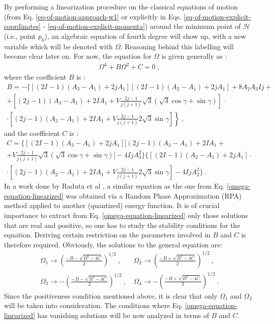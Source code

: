By performing a linearization procedure on the classical equations of motion (from Eq. \ref{eq-of-motion-approach-w1} or explicitly in Eqs. \ref{eq-of-motion-explicit-coordinates} - \ref{eq-of-motion-explicit-momenta}) around the minimum point of $\mathcal{H}$ (i.e., point $p_0$), an algebraic equation of fourth degree will show up, with a new variable which will be denoted with $\Omega$. Reasoning behind this labelling will become clear later on. For now, the equation for $\Omega$ is given generally as \cite{raduta2020towards}:
\begin{align}
    \Omega^4+B\Omega^2+C=0\ ,
    \label{omega-equation-linearized}
\end{align}
where the coefficient $B$ is \cite{raduta2020approach}:
\begin{multline}
    B=-\bigg\{\left[ (2I-1)(A_3-A_1)+2jA_1\right]\left[(2I-1)(A_2-A_1)+2jA_1\right]+8A_2A_3Ij+\\
    +\left[(2j-1)(A_3-A_1)+2IA_1+V\frac{2j-1}{j(j+1)}\sqrt{3}\left(\sqrt{3}\cos\gamma+\sin\gamma\right)\right]\cdot\\
    \left.\cdot\left[(2j-1)(A_2-A_1)+2IA_1+V\frac{2j-1}{j(j+1)}2\sqrt{3}\sin\gamma\right]\right\}\ ,
    \label{omega-B-term}
\end{multline}
and the coefficient $C$ is \cite{raduta2020approach}:
\begin{multline}
    C=\bigg\{\left[(2I-1)(A_3-A_1)+2jA_1\right]\bigg[(2j-1)(A_3-A_1)+2IA_1+\\
    +V\frac{2j-1}{j(j+1)}\sqrt{3}(\sqrt{3}\cos\gamma+\sin\gamma)\bigg]-4IjA_3^2\bigg\}\bigg\{\left[(2I-1)(A_2-A_1)+2jA_1\right]\cdot\\
    \cdot\left[(2j-1)(A_2-A_1)+2IA_1+V\frac{2j-1}{j(j+1)}2\sqrt{3}\sin\gamma\right]-4IjA_2^2\bigg\}\ .
    \label{omega-C-term}
\end{multline}
In a work done by Raduta et al \cite{raduta2017semiclassical}, a similar equation as the one from Eq. \ref{omega-equation-linearized} was obtained via a Random Phase Approximation (RPA) method applied to another (quantized) energy function. It is of crucial importance to extract from Eq. \ref{omega-equation-linearized} only those solutions that are real and positive, so one has to study the stability conditions for the equation. Deriving certain restriction on the parameters involved in $B$ and $C$ is therefore required. Obviously, the solutions to the general equation are:
\begin{align}
    \Omega_1 \to \left(\frac{-B-\sqrt{B^2-4 C}}{2}\right)^{1/2}\ ,&\ \Omega_2 \to \left(\frac{-B+\sqrt{B^2-4 C}}{2}\right)^{1/2}\ ,\nonumber\\
    \Omega_3 \to -\left(\frac{-B-\sqrt{B^2-4 C}}{2}\right)^{1/2}\ ,&\ \Omega_4 \to -\left(\frac{-B+\sqrt{B^2-4 C}}{2}\right)^{1/2}\ .
    \label{omega-1-2-3-4-solutions}
\end{align}
Since the positiveness condition mentioned above, it is clear that only $\Omega_1$ and $\Omega_2$ will be taken into consideration. The conditions where Eq. \ref{omega-equation-linearized} has vanishing solutions will be now analyzed in terms of $B$ and $C$.

